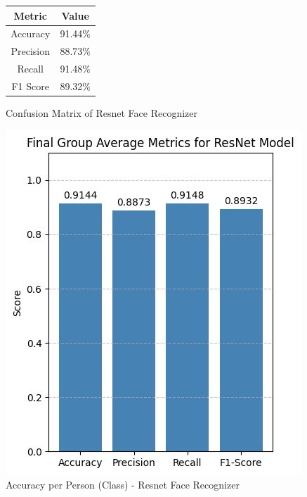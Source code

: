 \documentclass[openany]{report}
\begin{document}
\begin{figure}[H]
    \centering
    \begin{minipage}{0.48\textwidth}
        \centering
        \begin{tabular}{|c|c|}
            \hline
            \textbf{Metric} & \textbf{Value} \\ 
            \hline
            Accuracy        & 91.44\%           \\ 
            \hline
            Precision       & 88.73\%           \\ 
            \hline
            Recall          & 91.48\%           \\ 
            \hline
            F1 Score        & 89.32\%         \\ 
            \hline
        \end{tabular}
        \caption{Confusion Matrix of Resnet Face Recognizer}
        \label{tab:confusion-metrics}
    \end{minipage}
    \hfill
    \begin{minipage}{0.48\textwidth}
        \centering
        \includegraphics[width=\textwidth]{../imgs/model_3_cp.jpg}
        \caption{Accuracy per Person (Class) - Resnet Face Recognizer}
        \label{fig:confusion-matrix}
    \end{minipage}
\end{figure}
\end{document}
